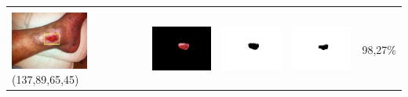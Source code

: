 \begin{table}[H]
\begin{tabular}{|m{1.0in}|m{1.0in}|m{1.0in}|m{1.0in}|m{0.6in}|}
		&  &  & \\
		\includegraphics[width=1.0in]{gambar/hasil_segmentasi/luka_merah/image_18_rect.jpg} {\centering\fontsize{10}{10}\selectfont(137,89,65,45)}&
		\includegraphics[width=1.0in]{gambar/hasil_segmentasi/luka_merah/result_18.jpg}&
		\includegraphics[width=1.0in]{gambar/hasil_segmentasi/luka_merah/mask_r_18.jpg}&
		\includegraphics[width=1.0in]{gambar/hasil_segmentasi/luka_merah/18_r.jpg}&
		98,27\% \\
		\hline
	\end{tabular}
\end{table}
		
